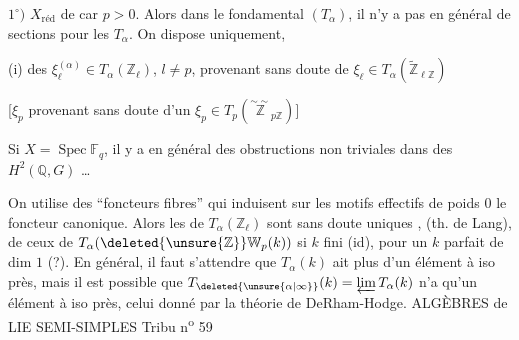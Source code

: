 $1^\circ)$ $X_{\mathrm{réd}}$ de car $p>0$. Alors dans le  fondamental $(T_\alpha)$, il n'y a pas en général de sections pour les $T_\alpha$.  On dispose uniquement, 

(i) des $\xi_{\ell}^{(\alpha)}\in T_\alpha(\mathbb{Z}_{\ell})$, $l\ne p$, provenant sans doute de $\xi_{\ell}\in T_\alpha(\widetilde{\mathbb{Z}}_{\ell\mathbb{Z}})$


[$\xi_p$ provenant sans doute d'un $\xi_p\in T_p(\overset{\sim\!\sim}{\mathbb{Z}}_{p\mathbb{Z}})$]

Si $X=\operatorname{Spec}\mathbb{F}_q$, il y a en général des  obstructions non triviales dans des $H^2(\mathbb{Q},G)$ \ldots

 On utilise des ``foncteurs fibres'' qui induisent sur les motifs effectifs de poids $0$ le foncteur canonique. Alors les  de $T_\alpha(\mathbb{Z}_\ell)$ sont sans doute uniques , (th. de Lang), de  ceux de $T_\alpha(\deleted{\unsure{\mathbb{Z}}}\mathbb{W}_p(k))$ si $k$ fini (id),  pour un $k$ parfait de dim  $1$ (?). En général, il faut s'attendre que $T_\alpha(k)$  ait plus d'un élément à iso près, mais il est possible que $T_{\deleted{\unsure{\alpha|\infty}}}(k)=\varprojlim T_\alpha(k)$ n'a qu'un élément à iso près, celui donné par la théorie de DeRham-Hodge.
ALGÈBRES de LIE SEMI-SIMPLES \hfill Tribu n\textsuperscript{o} 59

